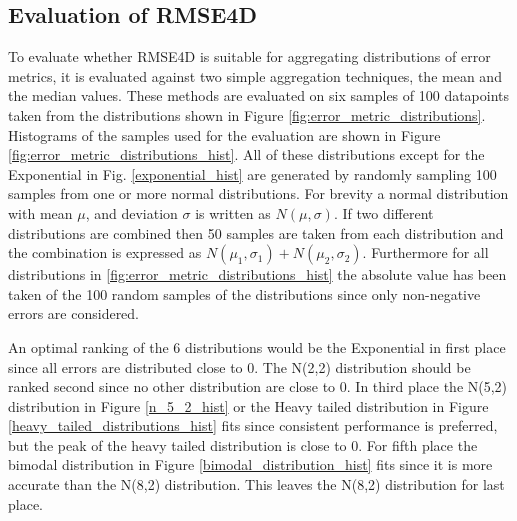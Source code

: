 \subsection{Evaluation of RMSE4D}
To evaluate whether RMSE4D is suitable for aggregating distributions of error metrics, it is evaluated against two simple aggregation techniques, the mean and the median values. These methods are evaluated on six samples of 100 datapoints taken from the distributions shown in Figure \ref{fig:error_metric_distributions}. Histograms of the samples used for the evaluation are shown in Figure \ref{fig:error_metric_distributions_hist}. All of these distributions except for the Exponential in Fig. \ref{exponential_hist} are generated by randomly sampling 100 samples from one or more normal distributions. For brevity a normal distribution with mean $\mu$, and deviation $\sigma$ is written as \(N(\mu,\sigma)\). If two different distributions are combined then 50 samples are taken from each distribution and the combination is expressed as \(N(\mu_1,\sigma_1) + N(\mu_2,\sigma_2)\). Furthermore for all distributions in \ref{fig:error_metric_distributions_hist} the absolute value has been taken of the 100 random samples of the distributions since only non-negative errors are considered.

An optimal ranking of the 6 distributions would be the Exponential in first place since all errors are distributed close to 0. The N(2,2) distribution should be ranked second since no other distribution are close to 0. In third place the N(5,2) distribution in Figure \ref{n_5_2_hist} or the Heavy tailed distribution in Figure \ref{heavy_tailed_distributions_hist} fits since consistent performance is preferred, but the peak of the heavy tailed distribution is close to 0. For fifth place the bimodal distribution in Figure \ref{bimodal_distribution_hist} fits since it is more accurate than the N(8,2) distribution. This leaves the N(8,2) distribution for last place.


